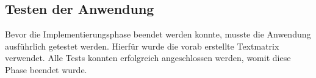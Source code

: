
\subsection{Testen der Anwendung}
\label{sec:Testen der Anwendung}
Bevor die Implementierungsphase beendet werden konnte, musste die Anwendung ausführlich getestet werden. Hierfür wurde die vorab erstellte Textmatrix verwendet. Alle Tests konnten erfolgreich angeschlossen werden, womit diese Phase beendet wurde.